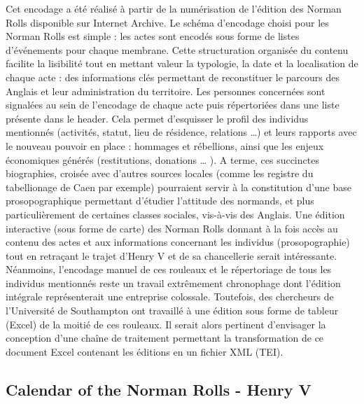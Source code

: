 \documentclass[a4paper,12pt,twoside]{book}
\begin{document}
    Cet encodage a été réalisé à partir de la numérisation de l'édition des Norman Rolls disponible sur Internet Archive.
            Le schéma d’encodage choisi pour les Norman Rolls est simple : les actes sont encodés sous forme de listes d’événements pour chaque membrane. 
            Cette structuration organisée du contenu facilite la lisibilité tout en mettant valeur la typologie, la date et la localisation de chaque acte : des informations clés permettant de reconstituer le parcours des Anglais et leur administration du territoire. 
            Les personnes concernées sont signalées au sein de l’encodage de chaque acte puis répertoriées dans une liste présente dans le header. 
            Cela permet d’esquisser le profil des individus mentionnés (activités, statut, lieu de résidence, relations …) et leurs rapports avec le nouveau pouvoir en place : hommages et rébellions, ainsi que les enjeux économiques générés (restitutions, donations … ). 
            A terme, ces succinctes biographies, croisée avec d’autres sources locales (comme les registre du tabellionage de Caen par exemple) pourraient servir à la constitution d’une base prosopographique permettant d’étudier l’attitude des normands, et plus particulièrement de certaines classes sociales, vis-à-vis des Anglais. 
            Une édition interactive (sous forme de carte) des Norman Rolls donnant à la fois accès au contenu des actes et aux informations concernant les individus (prosopographie) tout en retraçant le trajet d’Henry V et de sa chancellerie serait intéressante. 
            Néanmoins, l’encodage manuel de ces rouleaux et le répertoriage de tous les individus mentionnés reste un travail extrêmement chronophage dont l’édition intégrale représenterait une entreprise colossale.
            Toutefois, des chercheurs de l'Université de Southampton ont travaillé à une édition sous forme de tableur (Excel) de la moitié de ces rouleaux. Il serait alors pertinent d'envisager la conception d'une chaîne de traitement permettant la transformation de ce document Excel contenant les éditions en un fichier XML (TEI).
         
        
    \bigskip
        
    \begin{Large}
    \section{Calendar of the Norman Rolls - Henry V}
    \end{Large}
        
\end{document}
